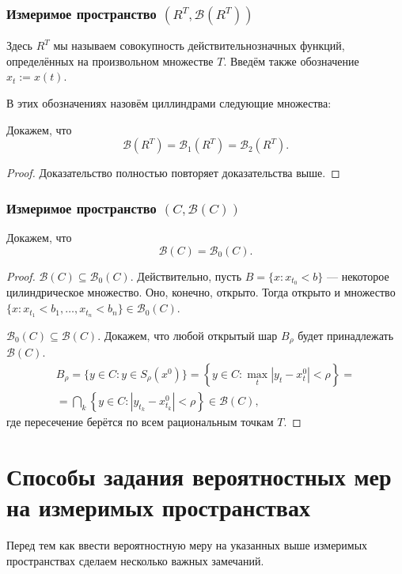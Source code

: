 \subsubsection{Измеримое пространство $( R^T, \mathscr B(R^T) )$}
Здесь $ R^T $ мы называем совокупность действительнозначных функций,
определённых на произвольном множестве $ T $. Введём также обозначение $ x_t :=
x(t)$.

В этих обозначениях назовём циллиндрами следующие множества:

\begin{theorem}
  Докажем, что  
  \[
      \mathscr B(R^T) = \mathscr B_1(R^T) = \mathscr B_2(R^T).
  \]
\end{theorem}
\begin{proof}
  Доказательство полностью повторяет доказательства выше.
\end{proof}


\subsubsection{Измеримое пространство $ (C, \mathscr B(C)) $}
\begin{theorem}
  Докажем, что  
  \[
      \mathscr B(C) = \mathscr B_0(C).
  \]
\end{theorem}
\begin{proof}
$ \mathscr B(C) \subseteq \mathscr B_0(C) $. Действительно, пусть $ B =
\{x\colon x_{t_0} < b\} $ --- некоторое цилиндрическое множество. Оно, конечно,
открыто. Тогда открыто и множество $ \{x\colon x_{t_1} < b_1, \ldots, x_{t_n} <
b_n\} \in \mathscr B_0(C)$.

$ \mathscr B_0(C) \subseteq \mathscr B(C) $. Докажем, что любой открытый шар $
B_\rho $ будет принадлежать $ \mathscr B(C) $. 
\begin{multline*}
  B_\rho = \{y \in C\colon y \in S_\rho(x^0)\} = \left\{ y \in C\colon \max_t
  |y_t - x_t^0| < \rho \right\} =\\=
  \bigcap_{k} \left\{ y \in C\colon |y_{t_k} - x_{t_k}^0 | < \rho \right\} \in
  \mathscr B(C),
\end{multline*}
где пересечение берётся по всем рациональным точкам $ T $.
\end{proof}



\section{Способы задания вероятностных мер на измеримых пространствах}
Перед тем как ввести вероятностную меру на указанных выше измеримых
пространствах сделаем несколько важных замечаний.

